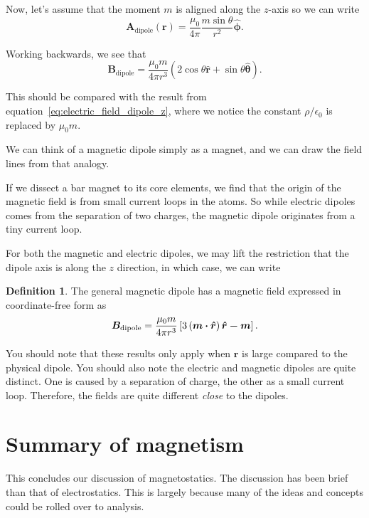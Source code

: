 \documentclass[12pt,chapterprefix=false,dvipsnames]{scrbook}
\theoremstyle{dotless}
\theoremstyle{definition}
\newtheorem{protodefinition}{Definition}[section]
\newenvironment{definition}
{\colorlet{shadecolor}{black!15}\begin{shaded}\begin{protodefinition}}
			{\end{protodefinition}\end{shaded}}
\begin{document}
Now, let's assume that the moment $m$ is
aligned along the $z$-axis so we can write
\begin{equation}
	\bm{A}_{\mathrm{dipole}}\left(\bm{r}\right)
	=
	\frac{\mu_{0}}{4\pi}\frac{m\sin{\theta}}{r^2}\bm{\hat{\phi}}.
\end{equation}

Working backwards, we see that
\begin{equation}
	\bm{B}_{\mathrm{dipole}}
	=
	\frac{\mu_{0}m}{4\pi r^3}\left(2\cos{\theta}\bm{\hat{r}}+\sin{\theta}\bm{\hat{\theta}}\right).
\end{equation}

This should be compared with the result from
equation~\ref{eq:electric_field_dipole_z}, where we notice the constant
$\rho/\epsilon_{0}$ is replaced by $\mu_{0}m$.

We can think of a magnetic dipole simply as a magnet, and we can
draw the field lines from that analogy.

If we dissect a bar magnet to its core elements, we find that
the origin of the magnetic field is from small current loops in
the atoms. So while electric dipoles comes from the separation
of two charges, the magnetic dipole originates from a tiny
current loop.

For both the magnetic and electric dipoles, we may lift the
restriction that the dipole axis is along the
$z$ direction, in which case, we can write
\begin{definition}
	The general magnetic dipole has a magnetic field expressed in
	coordinate-free form as
	\begin{equation}
		\bm{B}_{\mathrm{dipole}}
		=
		\frac{\mu_{0}m}{4\pi r^3}\left[3\left(\bm{m}\vdot\bm{\hat{r}}\right)\bm{\hat{r} - \bm{m}}\right].
	\end{equation}
\end{definition}

You should note that these results only apply when
$\bm{r}$ is large compared to the physical
dipole. You should also note the electric and magnetic dipoles
are quite distinct. One is caused by a separation of charge, the
other as a small current loop. Therefore, the fields are quite
different \textit{close} to the dipoles.

\section{Summary of magnetism}%
\label{sec:summary_of_magnetism}%

This concludes our discussion of magnetostatics. The discussion
has been brief than that of electrostatics. This is largely
because many of the ideas and concepts could be rolled over to
analysis.
\end{document}
